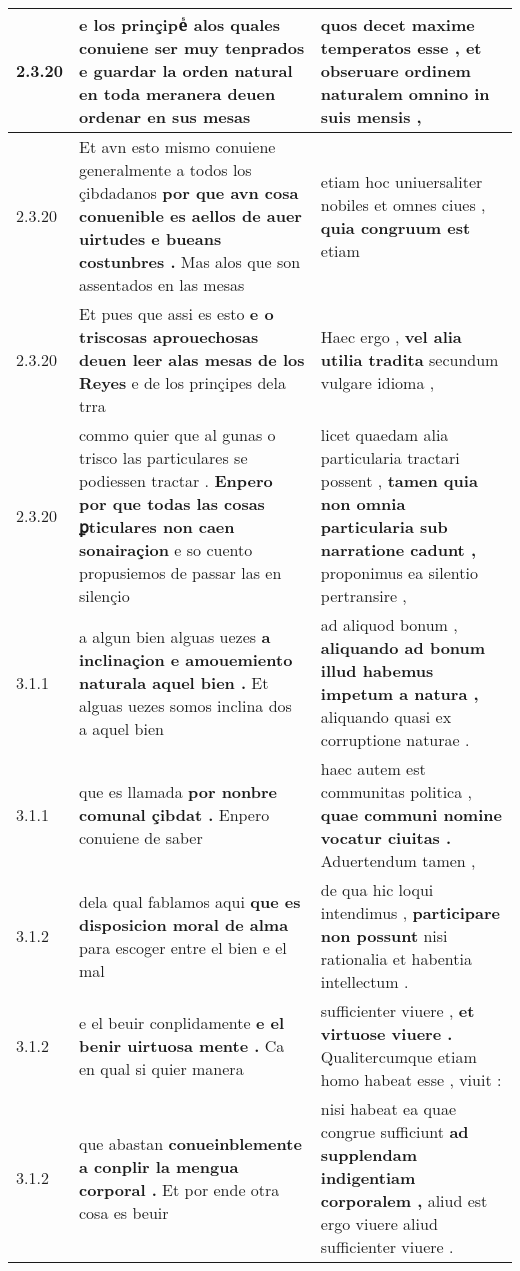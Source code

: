 \begin{tabular}{|p{1cm}|p{6.5cm}|p{6.5cm}|}
2.3.20 & e los prinçipeᷤ alos quales conuiene ser muy tenprados \textbf{ e guardar la orden natural en toda } meranera deuen ordenar en sus mesas & quos decet maxime temperatos esse , \textbf{ et obseruare ordinem naturalem } omnino in suis mensis , \\\hline
2.3.20 & Et avn esto mismo conuiene generalmente a todos los çibdadanos \textbf{ por que avn cosa conuenible es aellos de auer uirtudes e bueans costunbres . } Mas alos que son assentados en las mesas & etiam hoc uniuersaliter nobiles et omnes ciues , \textbf{ quia congruum est } etiam \\\hline
2.3.20 & Et pues que assi es esto \textbf{ e o triscosas aprouechosas deuen leer alas mesas de los Reyes } e de los prinçipes dela trra & Haec ergo , \textbf{ vel alia utilia tradita } secundum vulgare idioma , \\\hline
2.3.20 & commo quier que al gunas o trisco las particulares se podiessen tractar . \textbf{ Enpero por que todas las cosas ꝑticulares non caen sonairaçion } e so cuento propusiemos de passar las en silençio & licet quaedam alia particularia tractari possent , \textbf{ tamen quia non omnia particularia sub narratione cadunt , } proponimus ea silentio pertransire , \\\hline
3.1.1 & a algun bien alguas uezes \textbf{ a inclinaçion e amouemiento naturala aquel bien . } Et alguas uezes somos inclina dos a aquel bien & ad aliquod bonum , \textbf{ aliquando ad bonum illud habemus impetum a natura , } aliquando quasi ex corruptione naturae . \\\hline
3.1.1 & que es llamada \textbf{ por nonbre comunal çibdat . } Enpero conuiene de saber & haec autem est communitas politica , \textbf{ quae communi nomine vocatur ciuitas . } Aduertendum tamen , \\\hline
3.1.2 & dela qual fablamos aqui \textbf{ que es disposicion moral de alma } para escoger entre el bien e el mal & de qua hic loqui intendimus , \textbf{ participare non possunt } nisi rationalia et habentia intellectum . \\\hline
3.1.2 & e el beuir conplidamente \textbf{ e el benir uirtuosa mente . } Ca en qual si quier manera & sufficienter viuere , \textbf{ et virtuose viuere . } Qualitercumque etiam homo habeat esse , viuit : \\\hline
3.1.2 & que abastan \textbf{ conueinblemente a conplir la mengua corporal . } Et por ende otra cosa es beuir & nisi habeat ea quae congrue sufficiunt \textbf{ ad supplendam indigentiam corporalem , } aliud est ergo viuere aliud sufficienter viuere . \\\hline

\end{tabular}
